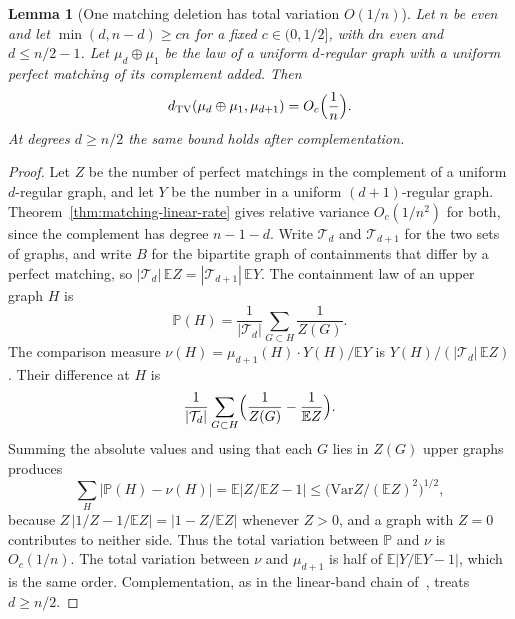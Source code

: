 \documentclass[11pt]{article}
\newtheorem{lemma}[theorem]{Lemma}
\newcommand{\EE}{\mathbb{E}}
\newcommand{\PP}{\mathbb{P}}
\newcommand{\Var}{\mathrm{Var}}
\newcommand{\dTV}{d_{\mathrm{TV}}}
\begin{document}
\begin{lemma}[One matching deletion has total variation \(O(1/n)\)]
\label{lem:matching-step-l1}
Let \(n\) be even and let \(\min(d,n-d)\ge cn\) for a fixed \(c\in(0,1/2]\),
with \(dn\) even and \(d\le n/2-1\).
Let \(\mu_d\oplus\mu_1\) be the law of a uniform \(d\)-regular graph with a
uniform perfect matching of its complement added.
Then
\[
\dTV(\mu_d\oplus\mu_1,\mu_{d+1})
=
O_c\Bigl(\frac1n\Bigr).
\]
At degrees \(d\ge n/2\) the same bound holds after complementation.
\end{lemma}

\begin{proof}
Let \(Z\) be the number of perfect matchings in the complement of a uniform
\(d\)-regular graph, and let \(Y\) be the number in a uniform \((d+1)\)-regular
graph. Theorem~\ref{thm:matching-linear-rate} gives relative variance
\(O_c(1/n^2)\) for both, since the complement has degree \(n-1-d\).
Write \(\mathcal T_d\) and \(\mathcal T_{d+1}\) for the two sets of graphs, and
write \(B\) for the bipartite graph of containments that differ by a perfect
matching, so \(|\mathcal T_d|\,\EE Z=|\mathcal T_{d+1}|\,\EE Y\).
The containment law of an upper graph \(H\) is
\[
\PP(H)=\frac1{|\mathcal T_d|}\sum_{G\subset H}\frac1{Z(G)}.
\]
The comparison measure \(\nu(H)=\mu_{d+1}(H)\cdot Y(H)/\EE Y\) is
\(Y(H)/(|\mathcal T_d|\,\EE Z)\). Their difference at \(H\) is
\[
\frac1{|\mathcal T_d|}\sum_{G\subset H}\Bigl(\frac1{Z(G)}-\frac1{\EE Z}\Bigr).
\]
Summing the absolute values and using that each \(G\) lies in \(Z(G)\) upper
graphs produces
\[
\sum_H\bigl|\PP(H)-\nu(H)\bigr|
=
\EE\bigl|Z/\EE Z-1\bigr|
\le
\bigl(\Var Z/(\EE Z)^2\bigr)^{1/2},
\]
because \(Z\,|1/Z-1/\EE Z|=|1-Z/\EE Z|\) whenever \(Z>0\), and a graph with
\(Z=0\) contributes to neither side.
Thus the total variation between \(\PP\) and \(\nu\) is \(O_c(1/n)\).
The total variation between \(\nu\) and \(\mu_{d+1}\) is half of
\(\EE|Y/\EE Y-1|\), which is the same order.
Complementation, as in the linear-band chain of~\cite{PlusOneV1}, treats
\(d\ge n/2\).
\end{proof}
\end{document}
